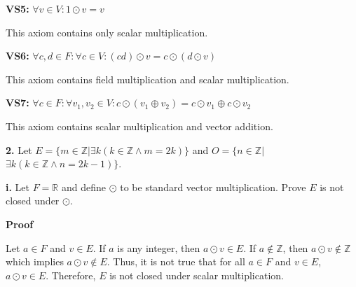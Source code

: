 \documentclass[12pt, a4paper]{article}
\begin{document}
\begin{description}
\item\textbf{VS5:} $\forall v\in V\colon 1\odot v=v$\par

This axiom contains only scalar multiplication.

\vspace{4mm}

\item\textbf{VS6:} $\forall c,d\in F\colon\forall c\in V\colon (cd)\odot v=c\odot(d\odot v)$\par

This axiom contains field multiplication and scalar multiplication.

\vspace{4mm}

\item\textbf{VS7:} $\forall c\in F\colon\forall v_1,v_2\in V\colon c\odot(v_1\oplus v_2)=c\odot v_1\oplus c\odot v_2$\par

This axiom contains scalar multiplication and vector addition.

\vspace{4mm}

\end{description}

\vspace{4mm}

\noindent\textbf{2.} Let $E=\{m\in\mathbb{Z}$\hspace{1mm}$|$\hspace{1mm}$\exists k (k\in\mathbb{Z}\wedge m=2k)\}$ and $O=\{n\in\mathbb{Z}$\hspace{1mm}$|$\hspace{1mm}$\exists k(k\in\mathbb{Z}\wedge n=2k-1)\}$.\par

\begin{description}

\item\textbf{i.} Let $F=\mathbb{R}$ and define $\odot$ to be standard vector multiplication. Prove $E$ is not closed under $\odot$.\par

\vspace{2mm}

\textbf{Proof}\par

Let $a\in F$ and $v\in E$. If $a$ is any integer, then $a\odot v\in E$. If $a\notin\mathbb{Z}$, then $a\odot v\notin\mathbb{Z}$ which implies $a\odot v\notin E$. Thus, it is not true that for all $a\in F$ and $v\in E$, $a\odot v\in E$. Therefore, $E$ is not closed under scalar multiplication.

\end{description}
\end{document}
